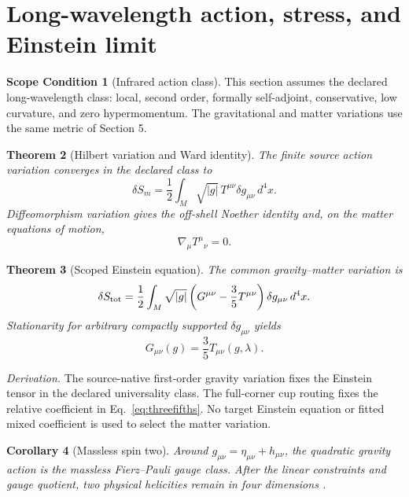 \documentclass[11pt]{article}
\newtheorem{theorem}{Theorem}[section]
\newtheorem{corollary}[theorem]{Corollary}
\theoremstyle{definition}
\newtheorem{scope}[theorem]{Scope Condition}
\theoremstyle{remark}
\begin{document}
\section{Long-wavelength action, stress, and Einstein limit}

\begin{scope}[Infrared action class]
This section assumes the declared long-wavelength class: local, second order, formally self-adjoint, conservative, low curvature, and zero hypermomentum. The gravitational and matter variations use the same metric of Section 5.
\end{scope}

\begin{theorem}[Hilbert variation and Ward identity]
The finite source action variation converges in the declared class to
\begin{equation}
\delta S_m
=\frac12\int_M\sqrt{|g|}\,T^{\mu\nu}\delta g_{\mu\nu}\,d^4x.
\label{eq:hilbert}
\end{equation}
Diffeomorphism variation gives the off-shell Noether identity and, on the matter equations of motion,
\begin{equation}
\nabla_\mu T^{\mu}{}_{\nu}=0.
\label{eq:ward}
\end{equation}
\end{theorem}

\begin{theorem}[Scoped Einstein equation]
The common gravity--matter variation is
\begin{equation}
\delta S_{\rm tot}
=\frac12\int_M\sqrt{|g|}
\left(G^{\mu\nu}-\frac35T^{\mu\nu}\right)
\delta g_{\mu\nu}\,d^4x.
\label{eq:totalvariation}
\end{equation}
Stationarity for arbitrary compactly supported $\delta g_{\mu\nu}$ yields
\begin{equation}
G_{\mu\nu}(g)=\frac35T_{\mu\nu}(g,\lambda).
\label{eq:einstein}
\end{equation}
\end{theorem}

\textit{Derivation.} The source-native first-order gravity variation fixes the Einstein tensor in the declared universality class. The full-corner cup routing fixes the relative coefficient in Eq.~\eqref{eq:threefifths}. No target Einstein equation or fitted mixed coefficient is used to select the matter variation.

\begin{corollary}[Massless spin two]
Around $g_{\mu\nu}=\eta_{\mu\nu}+h_{\mu\nu}$, the quadratic gravity action is the massless Fierz--Pauli gauge class. After the linear constraints and gauge quotient, two physical helicities remain in four dimensions \cite{fierzpauli1939}.
\end{corollary}
\end{document}
